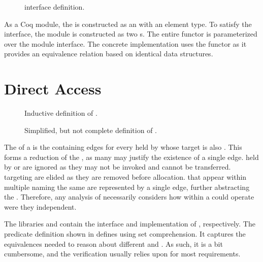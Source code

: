 \begin{figure}
  \COQDOCAccessEdge{}
  
  \COQDOCAccessGraph{}
  \caption{\xmakefirstuc{\TMaccessGraph{}} interface definition. \label{fig:access:accessGraphs}}
\end{figure}

As a Coq module, the \TMaccessGraph{} is constructed as an \COQFSetList{} with an \COQAccessEdge{} element type.
To satisfy the \COQusualOrderedType{} interface, the \COQAccessEdge{} module is constructed as two \COQProductType{}s.
The entire functor is parameterized over the \COQReferenceType{} module interface.
The concrete implementation uses the \COQFSetList{} functor as it provides an equivalence relation based on identical data structures.

\section{Direct Access}

\begin{figure}
  \COQDOCdirAccSpec{}
  \caption{Inductive definition of \TMdirAccAG{}. \label{fig:access:dirAccSpec}}
\end{figure}

\begin{figure}
  \COQDOCdirAccSimpl{}
  \caption{Simplified, but not complete definition of \TMdirAccAG{}. \label{fig:access:dirAccSimpl}}
\end{figure}

The \Term{\TMdirAccAG{}} of a \TMsystemState{} is the \TMaccessGraph{} containing edges for every \TMcap{} held by \TMalive{} \TMobjs{} whose target is also \TMalive{}.
This forms a reduction of the \TMsystemState{}, as many \TMcaps{} may justify the existence of a single edge.
\xmakefirstuc{\TMcaps} held by \TMdead{} or \TMunborn{} \TMobjs{} are ignored as they may not be invoked and cannot be transferred.
\xmakefirstuc{\TMcaps} targeting \TMunborn{} \TMobjs{} are elided as they are removed before allocation.
\xmakefirstuc{\TMaccessRights} that appear within multiple \TMcaps{} naming the same \TMobj{} are represented by a single edge, further abstracting the \TMsystemState{}.
Therefore, any analysis of \TMaccessGraphs{} necessarily considers how \TMaccessRights{} within a \TMcap{} could operate were they independent.

The libraries \COQDirectAccess{} and \COQDirectAccessImpl{} contain the interface and implementation of \TMdirAcc{}, respectively.
The \COQdirAccSpec{} predicate definition shown in  defines \TMdirAcc{} using set comprehension.
It captures the equivalences needed to reason about different \TMsystemStates{} and \TMaccessGraphs{}.
As such, it is a bit cumbersome, and the verification usually relies upon \COQdirAccSimpl{} for most requirements.

